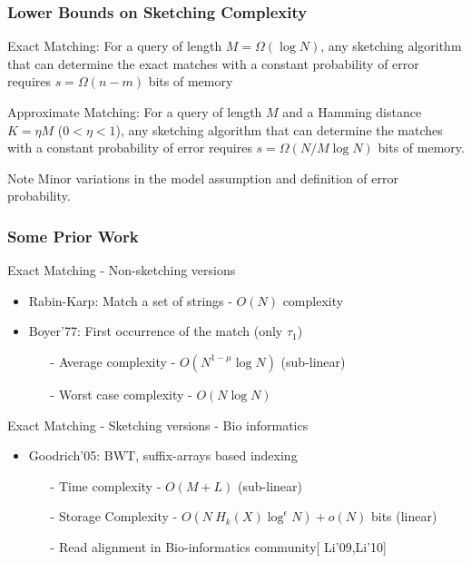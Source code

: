 \documentclass[10pt,xcolor=table]{beamer}
\begin{document}
\begin{frame} \frametitle{Lower Bounds on Sketching Complexity}
	\begin{block}{Exact Matching:}
		For a query of length $M = \Omega(\log N)$, any sketching algorithm that can determine the exact matches with a constant probability of error requires \alert{$s = \Omega(n-m)$} bits of memory
	\end{block}
	
	\begin{block}{Approximate Matching:}
		For a query of length $M$ and a Hamming distance $K= \eta M$ ($0<\eta<1$), any sketching algorithm that can determine the matches with a constant probability of error requires \alert{$s = \Omega (N/M \log N)$} bits of memory.
	\end{block}
	
	\begin{block}{Note}
		 Minor variations in the model assumption and definition of error probability.
	\end{block}
\end{frame}
\begin{frame} \frametitle{Some Prior Work}
	\vspace{-0.2cm}
	 \begin{block}{Exact Matching - Non-sketching versions}	 	
	 	\begin{itemize}
            \item  {Rabin-Karp}: Match a set of strings - $O(N)$ complexity
	 		\item  {Boyer'77}: First occurrence of the match (only $\tau_1$)	 		
	 		\begin{itemize}
	 			\item[-] Average complexity - $O(N^{1-\mu} \log N)$ (sub-linear)
	 			\item[-] Worst case complexity - $O(N \log N)$
	 		\end{itemize}	
	 	\end{itemize}
	 \end{block}
	
	 \begin{block}{Exact Matching - Sketching versions - Bio informatics} 	
	 	\begin{itemize}
	 		\item  {Goodrich'05}: BWT, suffix-arrays based indexing
	 		\begin{itemize}
	 			\item[-] Time complexity - $O(M + L)$ (sub-linear)
	 			\item[-] Storage Complexity - $O(N~H_k(X) \log^\epsilon N) + o(N)$ bits  (linear)
	 			\item[-] Read alignment in Bio-informatics community[ {\color{blue}Li'09,Li'10}]
	 		\end{itemize}	 		
	 	\end{itemize}
	 \end{block}
\end{frame}
\end{document}
